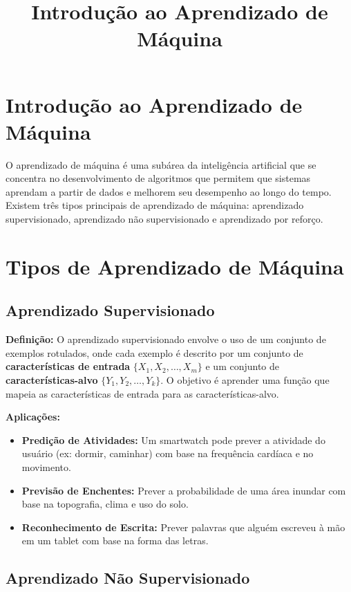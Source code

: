 \documentclass{article}
\title{Introdução ao Aprendizado de Máquina}
\author{}
\date{}
\begin{document}
\maketitle

\section{Introdução ao Aprendizado de Máquina}

O aprendizado de máquina é uma subárea da inteligência artificial que se concentra no desenvolvimento de algoritmos que permitem que sistemas aprendam a partir de dados e melhorem seu desempenho ao longo do tempo. Existem três tipos principais de aprendizado de máquina: aprendizado supervisionado, aprendizado não supervisionado e aprendizado por reforço.

\section{Tipos de Aprendizado de Máquina}

\subsection{Aprendizado Supervisionado}

\textbf{Definição:} O aprendizado supervisionado envolve o uso de um conjunto de exemplos rotulados, onde cada exemplo é descrito por um conjunto de \textbf{características de entrada} $\{X_1, X_2, \dots, X_m\}$ e um conjunto de \textbf{características-alvo} $\{Y_1, Y_2, \dots, Y_k\}$. O objetivo é aprender uma função que mapeia as características de entrada para as características-alvo.

\textbf{Aplicações:}
\begin{itemize}
    \item \textbf{Predição de Atividades:} Um smartwatch pode prever a atividade do usuário (ex: dormir, caminhar) com base na frequência cardíaca e no movimento.
    \item \textbf{Previsão de Enchentes:} Prever a probabilidade de uma área inundar com base na topografia, clima e uso do solo.
    \item \textbf{Reconhecimento de Escrita:} Prever palavras que alguém escreveu à mão em um tablet com base na forma das letras.
\end{itemize}

\subsection{Aprendizado Não Supervisionado}
\end{document}

